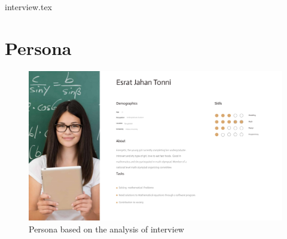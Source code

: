 \documentclass{article}
\begin{document}
{interview.tex}

\section{Persona}
\begin{figure}[h!]
  
  \includegraphics[width=1\textwidth]{persona}
  \centering
  \caption{Persona based on the analysis of interview
}
\end{figure}

\printbibliography
\end{document}

